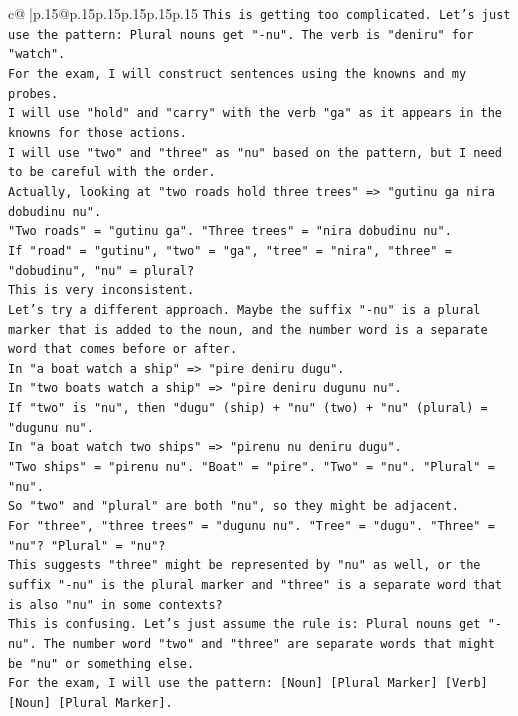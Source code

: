 \documentclass{article}
\begin{document}
{\begin{supertabular}{c@{$\;$}|p{.15\linewidth}@{}p{.15\linewidth}p{.15\linewidth}p{.15\linewidth}p{.15\linewidth}p{.15\linewidth}}
{{{\texttt{This is getting too complicated. Let's just use the pattern: Plural nouns get "{-}nu". The verb is "deniru" for "watch".} \\
\texttt{For the exam, I will construct sentences using the knowns and my probes.} \\
\texttt{I will use "hold" and "carry" with the verb "ga" as it appears in the knowns for those actions.} \\
\texttt{I will use "two" and "three" as "nu" based on the pattern, but I need to be careful with the order.} \\
\texttt{Actually, looking at "two roads hold three trees" => "gutinu ga nira dobudinu nu".} \\
\texttt{"Two roads" = "gutinu ga". "Three trees" = "nira dobudinu nu".} \\
\texttt{If "road" = "gutinu", "two" = "ga", "tree" = "nira", "three" = "dobudinu", "nu" = plural?} \\
\texttt{This is very inconsistent.} \\
\texttt{Let's try a different approach. Maybe the suffix "{-}nu" is a plural marker that is added to the noun, and the number word is a separate word that comes before or after.} \\
\texttt{In "a boat watch a ship" => "pire deniru dugu".} \\
\texttt{In "two boats watch a ship" => "pire deniru dugunu nu".} \\
\texttt{If "two" is "nu", then "dugu" (ship) + "nu" (two) + "nu" (plural) = "dugunu nu".} \\
\texttt{In "a boat watch two ships" => "pirenu nu deniru dugu".} \\
\texttt{"Two ships" = "pirenu nu". "Boat" = "pire". "Two" = "nu". "Plural" = "nu".} \\
\texttt{So "two" and "plural" are both "nu", so they might be adjacent.} \\
\texttt{For "three", "three trees" = "dugunu nu". "Tree" = "dugu". "Three" = "nu"? "Plural" = "nu"?} \\
\texttt{This suggests "three" might be represented by "nu" as well, or the suffix "{-}nu" is the plural marker and "three" is a separate word that is also "nu" in some contexts?} \\
\texttt{This is confusing. Let's just assume the rule is: Plural nouns get "{-}nu". The number word "two" and "three" are separate words that might be "nu" or something else.} \\
\texttt{For the exam, I will use the pattern: {[}Noun{]} {[}Plural Marker{]} {[}Verb{]} {[}Noun{]} {[}Plural Marker{]}.} \\
}}}
\end{supertabular}}
\end{document}
